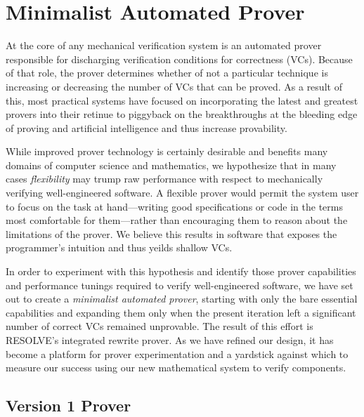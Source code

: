


\chapter{Minimalist Automated Prover\label{ch:prover}}
At the core of any mechanical verification system is an automated prover responsible for discharging verification conditions for correctness (VCs).  Because of that role, the prover determines whether of not a particular technique is increasing or decreasing the number of VCs that can be proved.  As a result of this, most practical systems have focused on incorporating the latest and greatest provers into their retinue to piggyback on the breakthroughs at the bleeding edge of proving and artificial intelligence and thus increase provability.

While improved prover technology is certainly desirable and benefits many domains of computer science and mathematics, we hypothesize that in many cases \emph{flexibility} may trump raw performance with respect to mechanically verifying well-engineered software.  A flexible prover would permit the system user to focus on the task at hand---writing good specifications or code in the terms most comfortable for them---rather than encouraging them to reason about the limitations of the prover.  We believe this results in software that exposes the programmer's intuition and thus yeilds shallow VCs.

In order to experiment with this hypothesis and identify those prover capabilities and performance tunings required to verify well-engineered software, we have set out to create a \emph{minimalist automated prover}, starting with only the bare essential capabilities and expanding them only when the present iteration left a significant number of correct VCs remained unprovable.  The result of this effort is RESOLVE's integrated rewrite prover.  As we have refined our design, it has become a platform for prover experimentation and a yardstick against which to measure our success using our new mathematical system to verify components.


\section{Version 1 Prover}

